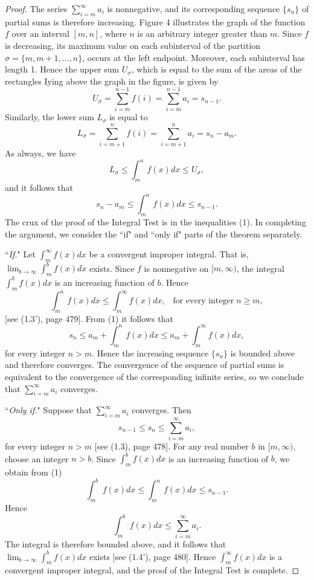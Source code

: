 \begin{proof}
The series $\sum_{i=m}^\infty a_i$ is nonnegative, and its corresponding sequence $\{ s_n \}$ of partial sums is therefore increasing. Figure 4 illustrates the graph of the function $f$ over an interval $[m, n]$, where $n$ is an arbitrary integer greater than $m$. Since $f$ is decreasing, its maximum value on each subinterval of the partition $\sigma = \{ m, m + 1, . . ., n \}$, occurs at the left endpoint. Moreover, each subinterval has length 1. Hence the upper sum $U_\sigma$, which is equal to the sum of the areas of the rectangles Iying above the graph in the figure, is given by
$$
U_\sigma = \sum_{i=m}^{n-1} f(i) = \sum_{i=m}^{n-1} a_i = s_{n-1}.
$$
Similarly, the lower sum $L_\sigma$ is equal to
$$
L_\sigma = \sum_{i=m+1}^n f(i) = \sum_{i=m+1}^n a_i = s_n - a_m. 
$$
As always, we have
$$
L_\sigma \leq \int_m^n f(x) dx \leq U_\sigma,  
$$
and it follows that
\begin{equation}
s_n - a_m \leq \int_m^n f(x) dx \leq s_{n-1}.  
\label{eq9.3.1}
\end{equation}
The crux of the proof of the Integral Test is in the inequalities (1). In completing the argument, we consider the ``if" and ``only if" parts of the theorem separately.

``\textit{If.}"  Let $\int_m^\infty f(x) dx$ be a convergent improper integral. That is, $\lim_{b \rightarrow \infty} \int_m^b f(x) dx$ exists. Since $f$ is nonnegative on $[m, \infty)$, the integral $\int_m^b f(x) dx$ is an increasing function of $b$. Hence 
$$
\int_m^n f(x)dx \leq \int_m^\infty f(x) dx, \;\;\;\mbox{for every integer}\; n \geq m,  
$$
[see (1.3'), page 479]. From (1) it follows that
$$
s_n \leq a_m + \int_m^n f(x) dx \leq a_m + \int_m^\infty f(x) dx,  
$$
for every integer $n > m$. Hence the increasing sequence $\{ s_n \}$ is bounded above and therefore converges. The convergence of the sequence of partial sums is equivalent to the convergence of the corresponding infinite series, so we conclude that $\sum_{i=m}^\infty a_i$ converges.

``\textit{Only if.}" Suppose that $\sum_{i=m}^\infty a_i$ converges. Then 
$$
s_{n-1} \leq s_n \leq \sum_{i=m}^\infty a_i ,
$$
for every integer $n > m$ [see (1.3), page 478]. For any real number $b$ in $[m, \infty)$, choose an integer $n > b$. Since $\int_m^b f(x) dx$ is an increasing function
of $b$, we obtain from (1)
$$
\int_m^b f(x) dx \leq \int_m^n f(x) dx \leq s_{n-1}.
$$
Hence
$$
\int_m^b f(x) dx \leq \sum_{i=m}^\infty a_i. 
$$
The integral is therefore bounded above, and it follows that $\lim_{b \rightarrow \infty} \int_m^b f(x) dx$ exists [see (1.4'), page 480]. Hence $\int_m^\infty f(x) dx$ is a convergent improper integral, and the proof of the Integral Test is complete.
\end{proof}


